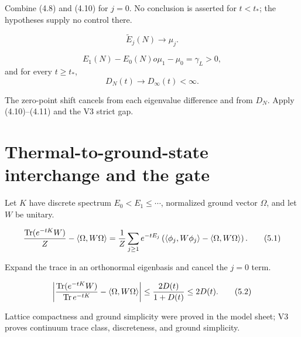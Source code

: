 \documentclass[11pt,a4paper]{article}
\newcommand{\Tr}{\operatorname{Tr}}
\begin{document}
\Because Combine (4.8) and (4.10) for $j=0$.  No conclusion is asserted for
$t<t_*$; the hypotheses supply no control there.

\QedStep



\[
 \widetilde E_j(N)\to\mu_j.
\tag{4.12}
\]

\[
 E_1(N)-E_0(N)	o\mu_1-\mu_0=\gamma_L>0,
\tag{4.13}
\]
and for every $t\ge t_*$,
\[
 D_N(t)\to D_\infty(t)<\infty.
\tag{4.14}
\]

\Because The zero-point shift cancels from each eigenvalue difference and from
$D_N$.  Apply (4.10)--(4.11) and the V3 strict gap.

\QedStep

\section{Thermal-to-ground-state interchange and the gate}


Let $K$ have discrete spectrum $E_0<E_1\le\cdots$, normalized ground vector
$\Omega$, and let $W$ be unitary.

\[
 \frac{\Tr(e^{-tK}W)}Z-\ip\Omega{W\Omega}
 =\frac1Z\sum_{j\ge1}e^{-tE_j}
 \left(\ip{\phi_j}{W\phi_j}-\ip\Omega{W\Omega}\right).
\tag{5.1}
\]

\Because Expand the trace in an orthonormal eigenbasis and cancel the $j=0$ term.

\[
 \left|\frac{\Tr(e^{-tK}W)}{\Tr e^{-tK}}-\ip\Omega{W\Omega}\right|
 \le\frac{2D(t)}{1+D(t)}\le2D(t).
\tag{5.2}
\]


\Because Lattice compactness and ground simplicity were proved in the model sheet;
V3 proves continuum trace class, discreteness, and ground simplicity.

\QedStep
\end{document}

